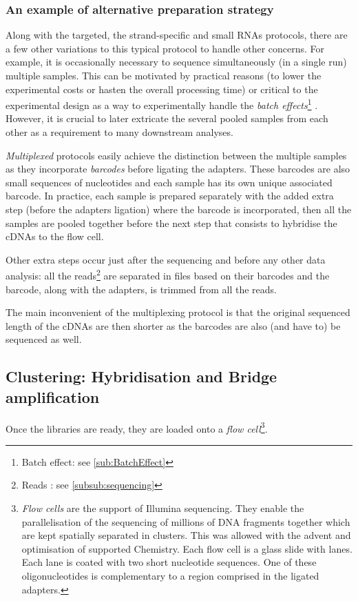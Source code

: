 \subsubsection{An example of alternative preparation strategy}
Along with the targeted, the strand-specific and small \glspl{RNA} protocols,
there are a few other variations to this typical protocol to handle other concerns.
For example, it is occasionally necessary to sequence simultaneously (in a single
run) multiple samples. This can be motivated by practical reasons
(to lower the experimental costs or hasten the overall processing time)
 or critical to the experimental design as a way to
experimentally handle the \emph{batch effects}\footnote{Batch effect: see
\cref{sub:BatchEffect}} . However, it is
crucial to later extricate the several pooled samples from each other as a
requirement to many downstream analyses.

\emph{Multiplexed} protocols easily achieve
the distinction between the multiple samples as they incorporate \emph{barcodes}
before ligating the adapters. These barcodes are also small sequences of
nucleotides and each sample has its own unique associated
barcode. In practice, each sample is prepared separately with the added extra
step (before the adapters ligation) where the barcode is incorporated, then all
the samples are pooled together before the next step that consists to hybridise
the \glspl{cDNA} to the flow cell.

Other extra steps occur just after the sequencing and before any other data
analysis: all the reads\footnote{Reads : see \cref{subsub:sequencing}} are
separated in files based on their barcodes and the barcode, along with the
adapters, is trimmed from all the reads.

The main inconvenient of the multiplexing protocol is that the original sequenced
length of the \glspl{cDNA} are then shorter as the barcodes are also (and have
to) be sequenced as well.

\subsection[Clustering: Hybridisation and Bridge amplification]{Clustering:
Hybridisation and Bridge amplification }
\label{sub:HybridClustAmp}

Once the libraries are ready, they are loaded onto a \emph{flow cell}\footnote{%
\emph{Flow cells} are the support of Illumina sequencing. They enable the
parallelisation of the sequencing of millions of \gls{DNA} fragments together
which are kept spatially separated in clusters. This was allowed with the advent
and optimisation of supported Chemistry. Each flow cell is a glass slide with
lanes. Each lane is coated with two short nucleotide sequences. One of these
oligonucleotides is complementary to a region comprised in the ligated adapters.}.

